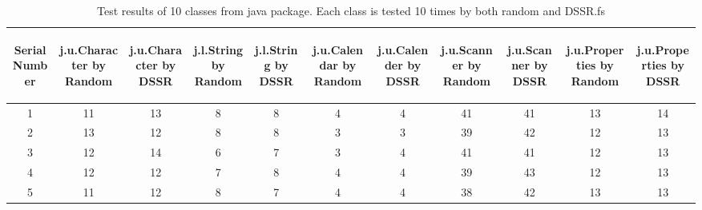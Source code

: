 \documentclass[10pt, conference, compsocconf]{IEEEtran}
\begin{document}
\begin{table}[ht]
\caption{Test results of 10 classes from java package. Each class is tested 10 times by both random and DSSR.fs} %
\centering %
\begin{tabular}{| c | c | c | c | c | c | c | c | c | c | c |} %
\hline\hline %
 \begin{sideways} Serial Number \end{sideways} &  \begin{sideways} j.u.Character by Random \end{sideways} &  \begin{sideways} j.u.Character by DSSR \end{sideways} &  \begin{sideways} j.l.String by Random \end{sideways} &  \begin{sideways} j.l.String by DSSR \end{sideways} & \begin{sideways} j.u.Calendar by Random \end{sideways} &  \begin{sideways}j.u.Calender by DSSR \end{sideways} &  \begin{sideways}j.u.Scanner by Random \end{sideways} &  \begin{sideways} j.u.Scanner by DSSR \end{sideways} &  \begin{sideways} j.u.Properties by Random \end{sideways} &  \begin{sideways} j.u.Properties by DSSR \end{sideways}  \\ [0.5ex] %
\hline %
1 & 11 & 13 & 8 & 8 & 4 & 4 & 41 & 41 & 13 & 14\\ %

2 & 13 & 12 & 8 & 8 & 3 & 3 & 39 & 42 & 12 & 13\\

3 & 12 & 14 & 6 & 7 & 3 & 4 & 41 & 41 & 12 & 13\\

4 & 12 & 12 & 7 & 8 & 4 & 4 & 39 & 43 & 12 & 13\\

5 & 11 & 12 & 8 & 7 & 4 & 4 & 38 & 42 & 13 & 13\\


\end{tabular}
\end{table}
\end{document}
